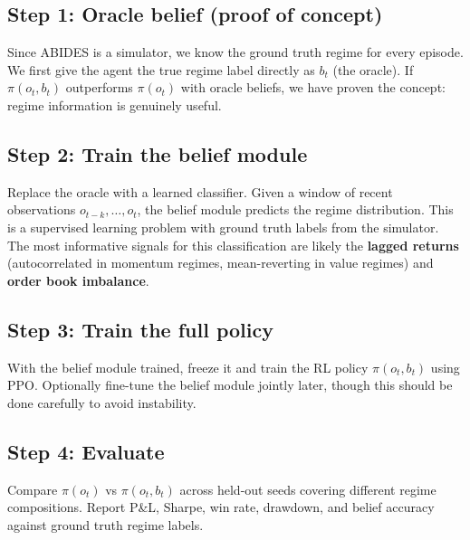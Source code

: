 \documentclass[11pt]{article}
\begin{document}
\subsection*{Step 1: Oracle belief (proof of concept)}

Since ABIDES is a simulator, we know the ground truth regime for every episode. We first give the agent the true regime label directly as $b_t$ (the oracle). If $\pi(o_t, b_t)$ outperforms $\pi(o_t)$ with oracle beliefs, we have proven the concept: regime information is genuinely useful.

\subsection*{Step 2: Train the belief module}

Replace the oracle with a learned classifier. Given a window of recent observations $o_{t-k}, \ldots, o_t$, the belief module predicts the regime distribution. This is a supervised learning problem with ground truth labels from the simulator. The most informative signals for this classification are likely the \textbf{lagged returns} (autocorrelated in momentum regimes, mean-reverting in value regimes) and \textbf{order book imbalance}.

\subsection*{Step 3: Train the full policy}

With the belief module trained, freeze it and train the RL policy $\pi(o_t, b_t)$ using PPO. Optionally fine-tune the belief module jointly later, though this should be done carefully to avoid instability.

\subsection*{Step 4: Evaluate}

Compare $\pi(o_t)$ vs $\pi(o_t, b_t)$ across held-out seeds covering different regime compositions. Report P\&L, Sharpe, win rate, drawdown, and belief accuracy against ground truth regime labels.
\end{document}

